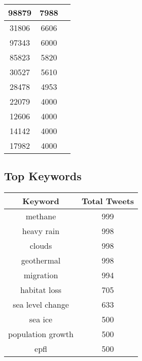 \documentclass{article}\usepackage[T1]{fontenc}
\begin{document}
\begin{tabular}{|c|c|c|}
 \hline
98879 & 7988\\ 
 \hline
31806 & 6606\\ 
 \hline
97343 & 6000\\ 
 \hline
85823 & 5820\\ 
 \hline
30527 & 5610\\ 
 \hline
28478 & 4953\\ 
 \hline
22079 & 4000\\ 
 \hline
12606 & 4000\\ 
 \hline
14142 & 4000\\ 
 \hline
17982 & 4000\\ 
 \hline
\end{tabular}\subsection*{Top Keywords}\begin{tabular}{|c|c|}         \hline         Keyword & Total Tweets \\ 
 \hline
methane & 999\\ 
 \hline
heavy rain & 998\\ 
 \hline
clouds & 998\\ 
 \hline
geothermal & 998\\ 
 \hline
migration & 994\\ 
 \hline
habitat loss & 705\\ 
 \hline
sea level change & 633\\ 
 \hline
sea ice & 500\\ 
 \hline
population growth & 500\\ 
 \hline
epfl & 500\\ 
 \hline
\end{tabular}
\end{document}
